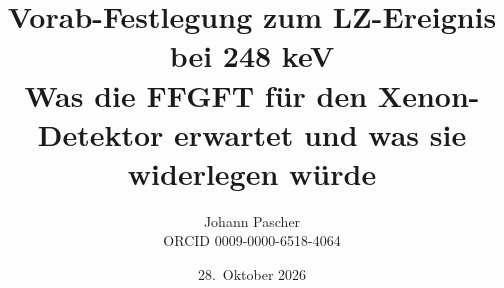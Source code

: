 \documentclass[11pt,a4paper]{report}
\title{Vorab-Festlegung zum LZ-Ereignis bei 248 keV\\[0.5em]
  \large Was die FFGFT für den Xenon-Detektor erwartet und was sie widerlegen würde}
\date{28.~Oktober 2026}
\author{Johann Pascher\\\small ORCID 0009-0000-6518-4064}
\begin{document}
\renewcommand{\thechapter}{}
\renewcommand{\thesection}{\arabic{section}}
\maketitle
\tableofcontents

\end{document}
